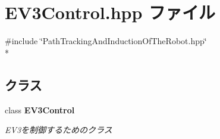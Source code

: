 \section{E\-V3\-Control.\-hpp ファイル}
\label{_e_v3_control_8hpp}
{\ttfamily \#include \char`\"{}Path\-Tracking\-And\-Induction\-Of\-The\-Robot.\-hpp\char`\"{}}\\*
\subsection*{クラス}
\begin{DoxyCompactItemize}
\item 
class {\bf E\-V3\-Control}
\begin{DoxyCompactList}\small\item\em E\-V3を制御するためのクラス \end{DoxyCompactList}\end{DoxyCompactItemize}
